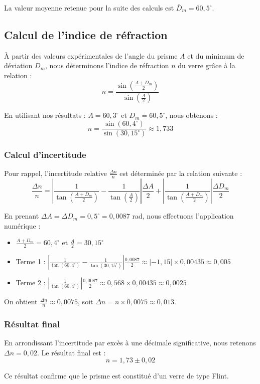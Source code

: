 La valeur moyenne retenue pour la suite des calculs est $\bar{D}_m = 60,5^\circ$.

\subsection{Calcul de l'indice de réfraction}

À partir des valeurs expérimentales de l'angle du prisme $A$ et du minimum de déviation $D_m$, nous déterminons l'indice de réfraction $n$ du verre grâce à la relation :
\[ n = \frac{\sin\left(\frac{A + D_m}{2}\right)}{\sin\left(\frac{A}{2}\right)} \]

En utilisant nos résultats : $A = 60,3^{\circ}$ et $D_m = 60,5^{\circ}$, nous obtenons :
\[ n = \frac{\sin(60,4^{\circ})}{\sin(30,15^{\circ})} \approx 1,733 \]

\subsubsection{Calcul d'incertitude}

Pour rappel, l'incertitude relative $\frac{\Delta n}{n}$ est déterminée par la relation suivante :
\[
    \frac{\Delta n}{n} = \left| \frac{1}{\tan\left(\frac{A + D_m}{2}\right)} - \frac{1}{\tan\left(\frac{A}{2}\right)} \right| \frac{\Delta A}{2} + \left| \frac{1}{\tan\left(\frac{A + D_m}{2}\right)} \right| \frac{\Delta D_m}{2}
\]

En prenant $\Delta A = \Delta D_m = 0,5^{\circ} = 0,0087$ rad, nous effectuons l'application numérique :
\begin{itemize}
    \item $\frac{A+D_m}{2} = 60,4^{\circ}$ et $\frac{A}{2} = 30,15^{\circ}$
    \item Terme 1 : $\left| \frac{1}{\tan(60,4^{\circ})} - \frac{1}{\tan(30,15^{\circ})} \right| \frac{0,0087}{2} \approx |-1,15| \times 0,00435 \approx 0,005$
    \item Terme 2 : $\left| \frac{1}{\tan(60,4^{\circ})} \right| \frac{0,0087}{2} \approx 0,568 \times 0,00435 \approx 0,0025$
\end{itemize}

On obtient $\frac{\Delta n}{n} \approx 0,0075$, soit $\Delta n = n \times 0,0075 \approx 0,013$.

\subsubsection{Résultat final}

En arrondissant l'incertitude par excès à une décimale significative, nous retenons $\Delta n = 0,02$. Le résultat final est :
\[ n = 1,73 \pm 0,02 \]

Ce résultat confirme que le prisme est constitué d'un verre de type Flint.
